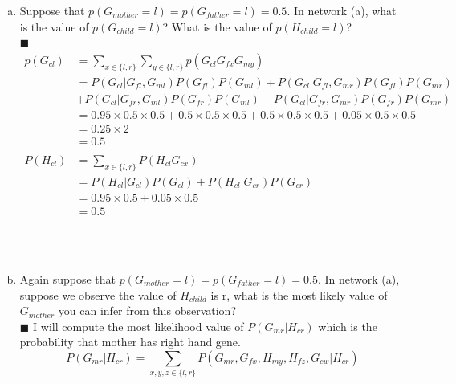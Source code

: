 \documentclass{article}
\newcommand{\solution}[1]{~\\ $\blacksquare$ \sffamily\upshape\selectfont #1
\normalfont ~\\~ }
\begin{document}
\begin{enumerate}[(a)]
\item Suppose that $p(G_{mother} = l) = p(G_{father} = l) = 0.5$. In
  network (a), what is the value of $p(G_{child} = l)$? What is the
  value of $p(H_{child} = l)$? 
\solution{
  \begin{align*}
    p(G_{cl}) & = \sum_{x\in \{l,r\}}\sum_{y\in \{l,r\}}p(G_{cl}G_{fx}G_{my})\\ 
    & = P(G_{cl}|G_{fl},G_{ml})P(G_{fl})P(G_{ml}) + 
    P(G_{cl}|G_{fl},G_{mr}) P(G_{fl})P(G_{mr}) \\
    & + P(G_{cl}|G_{fr},G_{ml})P(G_{fr})P(G_{ml}) + 
    P(G_{cl}|G_{fr},G_{mr})P(G_{fr})P(G_{mr}) \\ 
    & = 0.95\times 0.5\times 0.5 + 0.5\times 0.5\times 0.5 + 
    0.5\times 0.5\times 0.5 + 0.05\times 0.5\times 0.5\\ 
    & = 0.25\times 2 \\ 
    & = 0.5 \\ 
    & \\
    P(H_{cl}) & = \sum_{x\in\{l,r\}}P(H_{cl}G_{cx}) \\ 
    & = P(H_{cl}|G_{cl})P(G_{cl}) + P(H_{cl}|G_{cr})P(G_{cr}) \\ 
    & = 0.95\times 0.5 + 0.05\times 0.5 \\ 
    & = 0.5
  \end{align*}
}
\item Again suppose that $p(G_{mother} = l) = p(G_{father} = l) =
0.5$. In network (a), suppose we observe the value of $H_{child}$ is r,
what is the most likely value of $G_{mother}$ you can infer from this
observation?
\solution{
  I will compute the most likelihood value of $P(G_{mr}|H_{cr})$ which is the
  probability that mother has right hand gene.
    \[ P(G_{mr}|H_{cr}) =
    \sum_{x,y,z\in\{l,r\}}P(G_{mr},G_{fx},H_{my},H_{fz},G_{cw}|H_{cr})
    \]
}
\end{enumerate}
\end{document}
